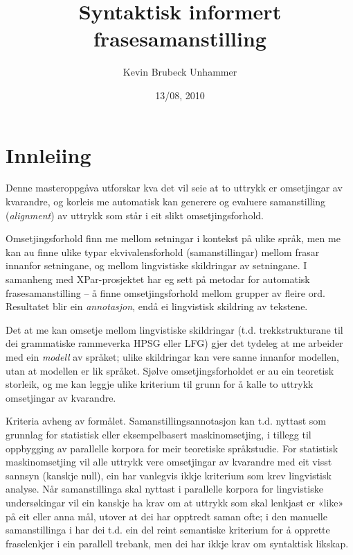 \documentclass[11pt,a4paper,oneside,draft]{book}
\title{Syntaktisk informert frasesamanstilling }
\author{Kevin Brubeck Unhammer}
\date{13/08, 2010}
\begin{document}
\maketitle

\setcounter{tocdepth}{4}
\tableofcontents
\vspace*{1cm}


\listoffixmes

\chapter{Innleiing}
\label{sec-1}

\label{SEC:innleiing}


Denne masteroppgåva utforskar kva det vil seie at to uttrykk er
omsetjingar av kvarandre, og korleis me automatisk kan generere og
evaluere samanstilling (\emph{alignment}) av uttrykk som
står i eit slikt omsetjingsforhold. 

Omsetjingsforhold finn me mellom setningar i kontekst på ulike språk,
men me kan au finne ulike typar ekvivalensforhold (samanstillingar)
mellom frasar innanfor setningane, og mellom lingvistiske
skildringar av setningane. I samanheng med XPar-prosjektet
\citep{xpar2008rcn} har eg sett på metodar for automatisk
frasesamanstilling – å finne omsetjingsforhold mellom grupper av
fleire ord. Resultatet blir ein \emph{annotasjon}, endå ei lingvistisk
skildring av tekstene.



Det at me kan omsetje mellom lingvistiske skildringar
(t.d. trekkstrukturane til dei grammatiske rammeverka HPSG eller LFG)
gjer det tydeleg at me arbeider med ein \emph{modell} av språket; ulike
skildringar kan vere sanne innanfor modellen, utan at modellen er lik
språket. Sjølve omsetjingsforholdet er au ein teoretisk storleik, og
me kan leggje ulike kriterium til grunn for å kalle to uttrykk
omsetjingar av kvarandre.

Kriteria avheng av formålet. Samanstillingsannotasjon kan t.d. nyttast
som grunnlag for statistisk eller eksempelbasert maskinomsetjing, i
tillegg til oppbygging av parallelle korpora for meir teoretiske
språkstudie.  For statistisk maskinomsetjing vil alle uttrykk vere
omsetjingar av kvarandre med eit visst sannsyn (kanskje null), ein
har vanlegvis ikkje kriterium som krev lingvistisk analyse. Når
samanstillinga skal nyttast i parallelle korpora for lingvistiske
undersøkingar vil ein kanskje ha krav om at uttrykk som skal lenkjast
er «like» på eit eller anna mål, utover at dei har opptredt saman
ofte; i den manuelle samanstillinga i \citet{samuelsson2006pap} har
dei t.d. ein del reint semantiske kriterium for å opprette
fraselenkjer i ein parallell trebank, men dei har ikkje krav om
syntaktisk likskap.
\end{document}
